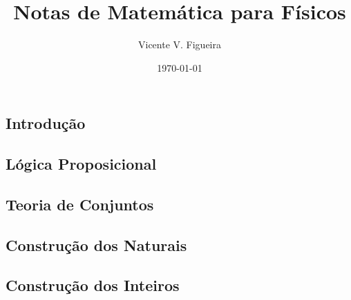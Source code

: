 \documentclass[twoside]{amsart}
\title{
Notas de Matemática para Físicos
}
\author{
  Vicente V. Figueira
       }
\date{\today}
\numberwithin{equation}{section}
\begin{document}
\maketitle

\tableofcontents


\begin{refsection}
\section{Introdução}

\printbibliography[heading=subbibliography]
\end{refsection}


\begin{refsection}
\section{Lógica Proposicional}

\printbibliography[heading=subbibliography]
\end{refsection}


\begin{refsection}
\section{Teoria de Conjuntos}

\printbibliography[heading=subbibliography]
\end{refsection}


\begin{refsection}
\section{Construção dos Naturais}

\printbibliography[heading=subbibliography]
\end{refsection}


\begin{refsection}
\section{Construção dos Inteiros}

\printbibliography[heading=subbibliography]
\end{refsection}
\end{document}
